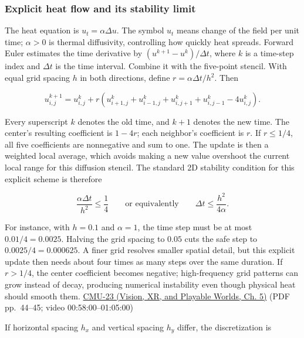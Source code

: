 \subsubsection{Explicit heat flow and its stability limit}\label{04-visual-computing-ii-ch030-explicit-heat-flow-and-its-stability-limit}

\hypertarget{04-visual-computing-ii-ch030-explicit-heat-flow-and-its-stability-limit}{}

The heat equation is \(u_t=\alpha\Delta u\). The symbol \(u_t\) means change of the field per unit time; \(\alpha>0\) is thermal diffusivity, controlling how quickly heat spreads. Forward Euler estimates the time derivative by \((u^{k+1}-u^k)/\Delta t\), where \(k\) is a time-step index and \(\Delta t\) is the time interval. Combine it with the five-point stencil. With equal grid spacing \(h\) in both directions, define \(r=\alpha\Delta t/h^2\). Then

\[
u_{i,j}^{k+1}=u_{i,j}^{k}+r\left(u_{i+1,j}^{k}+u_{i-1,j}^{k}+u_{i,j+1}^{k}+u_{i,j-1}^{k}-4u_{i,j}^{k}\right).
\]

Every superscript \(k\) denotes the old time, and \(k+1\) denotes the new time. The center's resulting coefficient is \(1-4r\); each neighbor's coefficient is \(r\). If \(r\le1/4\), all five coefficients are nonnegative and sum to one. The update is then a weighted local average, which avoids making a new value overshoot the current local range for this diffusion stencil. The standard 2D stability condition for this explicit scheme is therefore

\[
\frac{\alpha\Delta t}{h^2}\le\frac14
\qquad\text{or equivalently}\qquad
\Delta t\le\frac{h^2}{4\alpha}.
\]

For instance, with \(h=0.1\) and \(\alpha=1\), the time step must be at most \(0.01/4=0.0025\). Halving the grid spacing to \(0.05\) cuts the safe step to \(0.0025/4=0.000625\). A finer grid resolves smaller spatial detail, but this explicit update then needs about four times as many steps over the same duration. If \(r>1/4\), the center coefficient becomes negative; high-frequency grid patterns can grow instead of decay, producing numerical instability even though physical heat should smooth them. \href{../07-Vision-XR-and-Playable-Worlds/main.pdf\#nameddest=04-visual-computing-ii-ch036-cmu-23---physically-based-animation-and-pdes}{CMU-23 (Vision, XR, and Playable Worlds, Ch. 5)} (PDF pp.~44--45; video 00:58:00--01:05:00)

If horizontal spacing \(h_x\) and vertical spacing \(h_y\) differ, the discretization is

